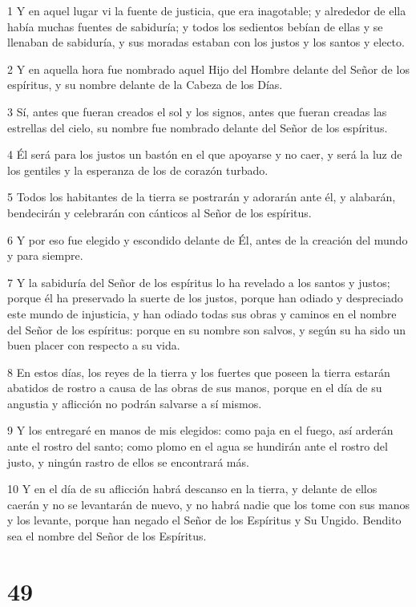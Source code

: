 \par 1 Y en aquel lugar vi la fuente de justicia, que era inagotable; y alrededor de ella había muchas fuentes de sabiduría; y todos los sedientos bebían de ellas y se llenaban de sabiduría, y sus moradas estaban con los justos y los santos y electo.
\par 2 Y en aquella hora fue nombrado aquel Hijo del Hombre delante del Señor de los espíritus, y su nombre delante de la Cabeza de los Días.
\par 3 Sí, antes que fueran creados el sol y los signos, antes que fueran creadas las estrellas del cielo, su nombre fue nombrado delante del Señor de los espíritus.
\par 4 Él será para los justos un bastón en el que apoyarse y no caer, y será la luz de los gentiles y la esperanza de los de corazón turbado.
\par 5 Todos los habitantes de la tierra se postrarán y adorarán ante él, y alabarán, bendecirán y celebrarán con cánticos al Señor de los espíritus.
\par 6 Y por eso fue elegido y escondido delante de Él, antes de la creación del mundo y para siempre.
\par 7 Y la sabiduría del Señor de los espíritus lo ha revelado a los santos y justos; porque él ha preservado la suerte de los justos, porque han odiado y despreciado este mundo de injusticia, y han odiado todas sus obras y caminos en el nombre del Señor de los espíritus: porque en su nombre son salvos, y según su ha sido un buen placer con respecto a su vida.
\par 8 En estos días, los reyes de la tierra y los fuertes que poseen la tierra estarán abatidos de rostro a causa de las obras de sus manos, porque en el día de su angustia y aflicción no podrán salvarse a sí mismos.
\par 9 Y los entregaré en manos de mis elegidos: como paja en el fuego, así arderán ante el rostro del santo; como plomo en el agua se hundirán ante el rostro del justo, y ningún rastro de ellos se encontrará más.
\par 10 Y en el día de su aflicción habrá descanso en la tierra, y delante de ellos caerán y no se levantarán de nuevo, y no habrá nadie que los tome con sus manos y los levante, porque han negado el Señor de los Espíritus y Su Ungido. Bendito sea el nombre del Señor de los Espíritus.

\chapter{49}

